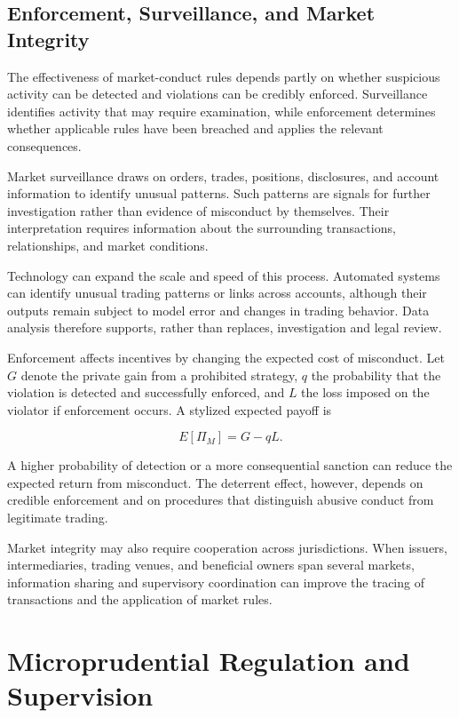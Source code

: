 \subsection{Enforcement, Surveillance, and Market Integrity}

The effectiveness of market-conduct rules depends partly on whether suspicious activity can be detected and violations can be credibly enforced. Surveillance identifies activity that may require examination, while enforcement determines whether applicable rules have been breached and applies the relevant consequences.

Market surveillance draws on orders, trades, positions, disclosures, and account information to identify unusual patterns. Such patterns are signals for further investigation rather than evidence of misconduct by themselves. Their interpretation requires information about the surrounding transactions, relationships, and market conditions.

Technology can expand the scale and speed of this process. Automated systems can identify unusual trading patterns or links across accounts, although their outputs remain subject to model error and changes in trading behavior. Data analysis therefore supports, rather than replaces, investigation and legal review.

Enforcement affects incentives by changing the expected cost of misconduct. Let \(G\) denote the private gain from a prohibited strategy, \(q\) the probability that the violation is detected and successfully enforced, and \(L\) the loss imposed on the violator if enforcement occurs. A stylized expected payoff is

\begin{equation}
E[\Pi_M]
=G-qL.
\label{eq:ch23-enforcement-deterrence}
\end{equation}

A higher probability of detection or a more consequential sanction can reduce the expected return from misconduct. The deterrent effect, however, depends on credible enforcement and on procedures that distinguish abusive conduct from legitimate trading.

Market integrity may also require cooperation across jurisdictions. When issuers, intermediaries, trading venues, and beneficial owners span several markets, information sharing and supervisory coordination can improve the tracing of transactions and the application of market rules.


\section{Microprudential Regulation and Supervision}

